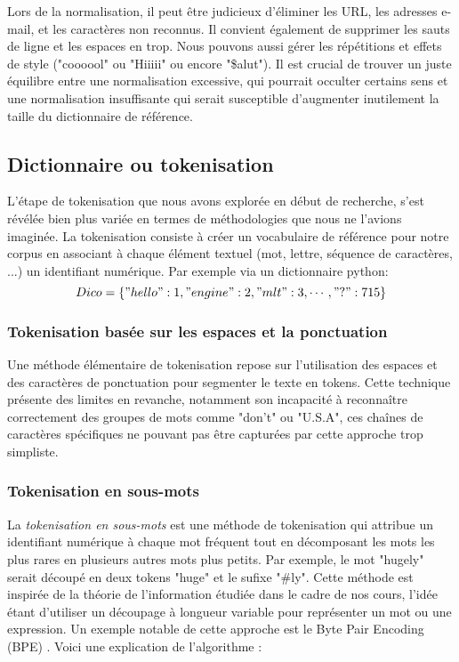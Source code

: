 \documentclass[12pt]{article}
\theoremstyle{definition}
\begin{document}
	 Lors de la normalisation, il peut être judicieux d'éliminer les URL, les adresses e-mail, et les caractères non reconnus. Il convient également de supprimer les sauts de ligne et les espaces en trop. Nous pouvons aussi gérer les répétitions et effets de style ("coooool" ou "Hiiiii" ou encore "\$alut"). Il est crucial de trouver un juste équilibre entre une normalisation excessive, qui pourrait occulter certains sens et une normalisation insuffisante qui serait susceptible d'augmenter inutilement la taille du dictionnaire de référence.
	\subsection{Dictionnaire ou tokenisation}
	
	L'étape de tokenisation que nous avons explorée en début de recherche, s'est révélée bien plus variée en termes de méthodologies que nous ne l'avions imaginée. La tokenisation consiste à créer un vocabulaire de référence pour notre corpus en associant à chaque élément textuel (mot, lettre, séquence de caractères, ...) un identifiant numérique. Par exemple via un dictionnaire python: $$Dico = \{"hello":1, "engine":2, "mlt":3, \cdots, "?":715\}$$ 
	

	\subsubsection{Tokenisation basée sur les espaces et la ponctuation}
	Une méthode élémentaire de tokenisation repose sur l'utilisation des espaces et des caractères de ponctuation pour segmenter le texte en tokens. Cette technique présente des limites en revanche, notamment son incapacité à reconnaître correctement des groupes de mots comme "don't" ou "U.S.A", ces chaînes de caractères spécifiques ne pouvant pas être capturées par cette approche trop simpliste.
	
	\subsubsection{Tokenisation en sous-mots}
	
	La \emph{tokenisation en sous-mots} est une méthode de tokenisation qui attribue un identifiant numérique à chaque mot fréquent tout en décomposant les mots les plus rares en plusieurs autres mots plus petits. Par exemple, le mot "hugely" serait découpé en deux tokens "huge" et le sufixe "\#ly". Cette méthode est inspirée de la théorie de l'information étudiée dans le cadre de nos cours, l'idée étant d'utiliser un découpage à longueur variable pour représenter un mot ou une expression. Un exemple notable de cette approche est le Byte Pair Encoding (BPE) \cite{BPE}. Voici une explication de l'algorithme : 
	
\end{document}
